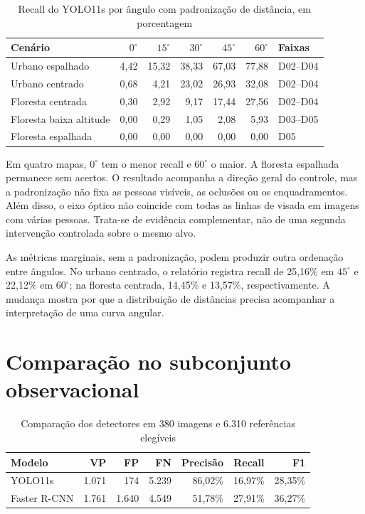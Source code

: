 \begin{table}[htb]
\caption{Recall do YOLO11s por ângulo com padronização de distância, em porcentagem}
\label{tab:angular-observacional}\centering\small
\begin{tabular}{lrrrrrl}
\toprule Cenário & $0^\circ$ & $15^\circ$ & $30^\circ$ & $45^\circ$ & $60^\circ$ & Faixas\\\midrule
Urbano espalhado & 4,42 & 15,32 & 38,33 & 67,03 & 77,88 & D02--D04\\
Urbano centrado & 0,68 & 4,21 & 23,02 & 26,93 & 32,08 & D02--D04\\
Floresta centrada & 0,30 & 2,92 & 9,17 & 17,44 & 27,56 & D02--D04\\
Floresta baixa altitude & 0,00 & 0,29 & 1,05 & 2,08 & 5,93 & D03--D05\\
Floresta espalhada & 0,00 & 0,00 & 0,00 & 0,00 & 0,00 & D05\\\bottomrule
\end{tabular}
\end{table}

Em quatro mapas, $0^\circ$ tem o menor recall e $60^\circ$ o maior. A floresta espalhada permanece sem acertos. O resultado acompanha a direção geral do controle, mas a padronização não fixa as pessoas visíveis, as oclusões ou os enquadramentos. Além disso, o eixo óptico não coincide com todas as linhas de visada em imagens com várias pessoas. Trata-se de evidência complementar, não de uma segunda intervenção controlada sobre o mesmo alvo.

As métricas marginais, sem a padronização, podem produzir outra ordenação entre ângulos. No urbano centrado, o relatório registra recall de 25,16\% em $45^\circ$ e 22,12\% em $60^\circ$; na floresta centrada, 14,45\% e 13,57\%, respectivamente. A mudança mostra por que a distribuição de distâncias precisa acompanhar a interpretação de uma curva angular.

\section{Comparação no subconjunto observacional}
\begin{table}[htb]
\caption{Comparação dos detectores em 380 imagens e 6.310 referências elegíveis}
\label{tab:subconjunto}\centering\small
\begin{tabular}{lrrrrrr}
\hline Modelo & VP & FP & FN & Precisão & Recall & F1\\\hline
YOLO11s & 1.071 & 174 & 5.239 & 86,02\% & 16,97\% & 28,35\%\\
Faster R-CNN & 1.761 & 1.640 & 4.549 & 51,78\% & 27,91\% & 36,27\%\\\hline
\end{tabular}
\end{table}


